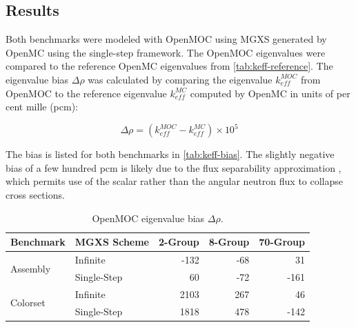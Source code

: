 \subsection{Results}
\label{subsec:results}

Both benchmarks were modeled with OpenMOC using MGXS generated by OpenMC using the single-step framework. The OpenMOC eigenvalues were compared to the reference OpenMC eigenvalues from \autoref{tab:keff-reference}. The eigenvalue bias $\Delta\rho$ was calculated by comparing the eigenvalue $k_{eff}^{MOC}$ from OpenMOC to the reference eigenvalue $k_{eff}^{MC}$ computed by OpenMC in units of per cent mille (pcm):

\begin{equation}
\label{eqn:delta-rho}
\Delta\rho = \left(k_{eff}^{MOC} - k_{eff}^{MC}\right) \times 10^{5}
\end{equation}

The bias is listed for both benchmarks in \autoref{tab:keff-bias}. The slightly negative bias of a few hundred pcm is likely due to the flux separability approximation \cite{boyd2017sph}, which permits use of the scalar rather than the angular neutron flux to collapse cross sections. 


\begin{table}[h!]
  \centering
  \caption{OpenMOC eigenvalue bias $\Delta\rho$.}
  \label{tab:keff-bias} 
  \begin{tabular}{l l r r r}
  \toprule
  \textbf{Benchmark} & \textbf{MGXS Scheme} & \textbf{2-Group} & \textbf{8-Group} & \textbf{70-Group} \\
  \midrule
  \multirow{2}{*}{Assembly} & Infinite    & -132 & -68 &   31 \\
                            & Single-Step &   60 & -72 & -161 \\
  \midrule
  \multirow{2}{*}{Colorset} & Infinite    & 2103 & 267 &   46 \\
                            & Single-Step & 1818 & 478 & -142 \\
  \bottomrule
\end{tabular}
\end{table}

